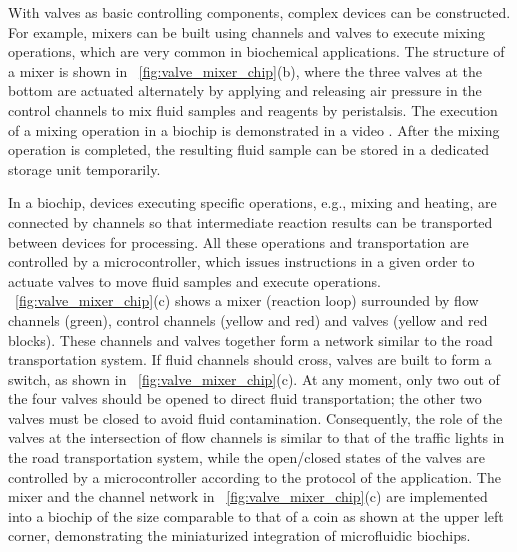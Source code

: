With valves as basic controlling components, complex devices 
can be constructed. For example, mixers can be built using
channels and valves to execute mixing operations, which are very
common in biochemical applications. The structure of a mixer is shown
in \figname~\ref{fig:valve_mixer_chip}(b),
where the three valves at the bottom are actuated alternately by 
applying and releasing air pressure in the control
channels 
to mix fluid samples and reagents by peristalsis.
The execution of a mixing operation in a biochip is demonstrated
in a video \cite{mixing_store}. 
After the mixing operation is completed, the resulting fluid sample 
can be stored in a dedicated storage unit temporarily. %

In a biochip, devices executing specific operations, e.g., mixing and heating,
are connected by channels so that intermediate reaction results %
can be
transported between devices for processing. All these operations and
transportation are controlled
by a microcontroller, which 
issues instructions in a given order to actuate valves 
to move fluid samples 
and execute operations.
\figname~\ref{fig:valve_mixer_chip}(c) shows a mixer (reaction loop) surrounded
by flow channels (green), control channels (yellow and red) and valves
(yellow and red blocks).
These channels and valves together form a network similar to the
road transportation system. If fluid channels should cross, %
valves are built %
to form a switch, as shown 
in \figname~\ref{fig:valve_mixer_chip}(c).
At any moment, only two out of the four valves should be opened to 
direct fluid transportation; 
the other two valves must be closed to avoid fluid
contamination. Consequently, the role of the valves at the intersection
of %
flow channels is similar to that of the traffic lights in the road
transportation system, while the open/closed states of the valves are
controlled by a microcontroller according to the protocol of the application.
The mixer and the channel network
in \figname~\ref{fig:valve_mixer_chip}(c)
are implemented into a biochip of the size comparable to that of a coin 
as shown %
at the upper left
corner, %
demonstrating the miniaturized integration of 
microfluidic biochips. 



